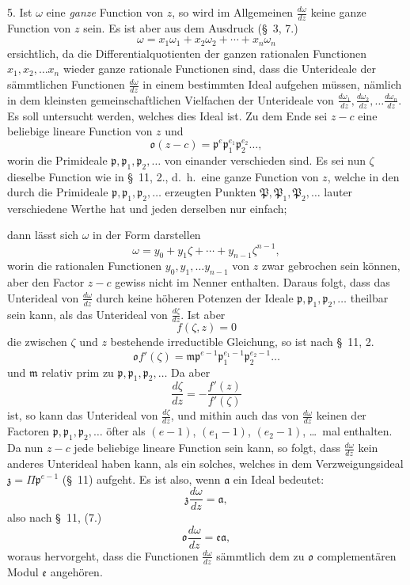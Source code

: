 \documentclass{article}
\begin{document}
5. Ist $\omega$ eine \emph{ganze} Function von $z$, so wird im Allgemeinen $\frac{d\omega}{dz}$ keine ganze Function von $z$ sein. Es ist aber aus dem Ausdruck (§~3, 7.)
\[ \omega = x_{1}\omega_{1} + x_{2}\omega_{2} + \cdots + x_{n}\omega_{n} \]
ersichtlich, da die Differentialquotienten der ganzen rationalen Functionen $x_{1}, x_{2}, \ldots x_{n}$ wieder ganze rationale Functionen sind, dass die Unterideale der sämmtlichen Functionen $\frac{d\omega}{dz}$ in einem bestimmten Ideal aufgehen müssen, nämlich in dem kleinsten gemeinschaftlichen Vielfachen der Unterideale von $\frac{d\omega_{1}}{dz}, \frac{d\omega_{2}}{dz}, \ldots \frac{d\omega_{n}}{dz}$. Es soll untersucht werden, welches dies Ideal ist. Zu dem Ende sei $z-c$ eine beliebige lineare Function von $z$ und
\[ \mathfrak{o}(z-c) = \mathfrak{p}^{e}\mathfrak{p}_{1}^{e_{1}}\mathfrak{p}_{2}^{e_{2}}\ldots, \]
worin die Primideale $\mathfrak{p}, \mathfrak{p}_{1}, \mathfrak{p}_{2}, \ldots$ von einander verschieden sind. Es sei nun $\zeta$ dieselbe Function wie in §~11, 2., d.\ h.\ eine ganze Function von $z$, welche in den durch die Primideale $\mathfrak{p}, \mathfrak{p}_{1}, \mathfrak{p}_{2}, \ldots$ erzeugten Punkten $\mathfrak{P}, \mathfrak{P}_{1}, \mathfrak{P}_{2}, \ldots$ lauter verschiedene Werthe hat und jeden derselben nur einfach;

dann lässt sich $\omega$ in der Form darstellen
\[ \omega = y_{0} + y_{1}\zeta + \cdots + y_{n-1}\zeta^{n-1}, \]
worin die rationalen Functionen $y_{0}, y_{1}, \ldots y_{n-1}$ von $z$ zwar gebrochen sein können, aber den Factor $z-c$ gewiss nicht im Nenner enthalten. Daraus folgt, dass das Unterideal von $\frac{d\omega}{dz}$ durch keine höheren Potenzen der Ideale $\mathfrak{p}, \mathfrak{p}_{1}, \mathfrak{p}_{2}, \ldots$ theilbar sein kann, als das Unterideal von $\frac{d\zeta}{dz}$. Ist aber
\[ f(\zeta, z) = 0 \]
die zwischen $\zeta$ und $z$ bestehende irreductible Gleichung, so ist nach §~11, 2.
\[ \mathfrak{o}f'(\zeta) = \mathfrak{m}\mathfrak{p}^{e-1}\mathfrak{p}_{1}^{e_{1}-1}\mathfrak{p}_{2}^{e_{2}-1}\ldots \]
und $\mathfrak{m}$ relativ prim zu $\mathfrak{p}, \mathfrak{p}_{1}, \mathfrak{p}_{2}, \ldots$ Da aber
\[ \frac{d\zeta}{dz} = -\frac{f'(z)}{f'(\zeta)} \]
ist, so kann das Unterideal von $\frac{d\zeta}{dz}$, und mithin auch das von $\frac{d\omega}{dz}$ keinen der Factoren $\mathfrak{p}, \mathfrak{p}_{1}, \mathfrak{p}_{2}, \ldots$ öfter als $(e-1)$, $(e_{1}-1)$, $(e_{2}-1)$, \ldots\ mal enthalten. Da nun $z-c$ jede beliebige lineare Function sein kann, so folgt, dass $\frac{d\omega}{dz}$ kein anderes Unterideal haben kann, als ein solches, welches in dem Verzweigungsideal $\mathfrak{z} = \Pi\mathfrak{p}^{e-1}$ (§~11) aufgeht. Es ist also, wenn $\mathfrak{a}$ ein Ideal bedeutet:
\[ \mathfrak{z}\frac{d\omega}{dz} = \mathfrak{a}, \]
also nach §~11, (7.)
\[ \mathfrak{o}\frac{d\omega}{dz} = \mathfrak{e}\mathfrak{a}, \]
woraus hervorgeht, dass die Functionen $\frac{d\omega}{dz}$ sämmtlich dem zu $\mathfrak{o}$ complementären Modul $\mathfrak{e}$ angehören.
\end{document}
